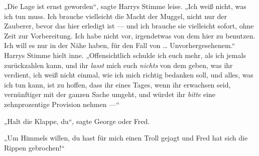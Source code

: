 „Die Lage ist ernst geworden“, sagte Harrys Stimme leise.
„Ich weiß nicht, was ich tun muss. Ich brauche vielleicht die Macht der Muggel, nicht nur der Zauberer, bevor das hier erledigt ist — und ich brauche sie vielleicht sofort, ohne Zeit zur Vorbereitung. Ich habe nicht vor, irgendetwas von dem hier zu benutzen. Ich will es nur in der Nähe haben, für den Fall von … Unvorhergesehenem.“
Harrys Stimme hielt inne.
„Offensichtlich schulde ich euch mehr, als ich jemals zurückzahlen kann, und ihr \emph{lasst} mich euch \emph{nichts} von dem geben, was ihr verdient, ich weiß nicht einmal, wie ich mich richtig bedanken soll, und alles, was ich tun kann, ist zu hoffen, dass ihr eines Tages, wenn ihr erwachsen seid, vernünftiger mit der ganzen Sache umgeht, und würdet ihr \emph{bitte} eine zehnprozentige Provision nehmen —“

„Halt die Klappe, du“, sagte George oder Fred.

„Um Himmels willen, du hast für mich einen Troll gejagt und Fred hat sich die Rippen gebrochen!“

